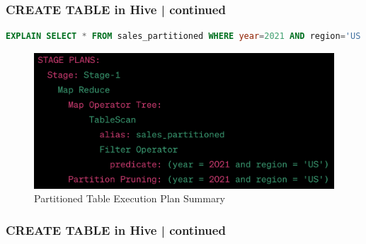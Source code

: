\begin{frame}[fragile]
	\frametitle{CREATE TABLE in Hive | continued}
	\vspace{-0.6cm}
	\begin{tcolorbox}[colback=white,colframe=black,title= Part 5: Table Partitions]
	\small
	\vspace{-0.3cm}
\begin{lstlisting}[caption={Explain Plan Command for Partitioned Table},language=SQL]
EXPLAIN SELECT * FROM sales_partitioned WHERE year=2021 AND region='US';
\end{lstlisting}
	\vspace{-0.5cm}
	\begin{figure}
	\includegraphics[width=.7\textwidth,height=\textheight,keepaspectratio]{./Figures/chapter-03/partitioned_explain.png}
\caption{Partitioned Table Execution Plan Summary}	
\end{figure}
\end{tcolorbox}
	
\end{frame}
\begin{frame}[fragile]
	\frametitle{CREATE TABLE in Hive | continued}
	\begin{tcolorbox}[colback=white,colframe=black,title= Part 5: Table Partitions]

	\begin{table}[h!]
		\centering
\caption{Comparison: Non-Partitioned vs Partitioned Table.}
\end{table}
\end{tcolorbox}
	
\end{frame}

